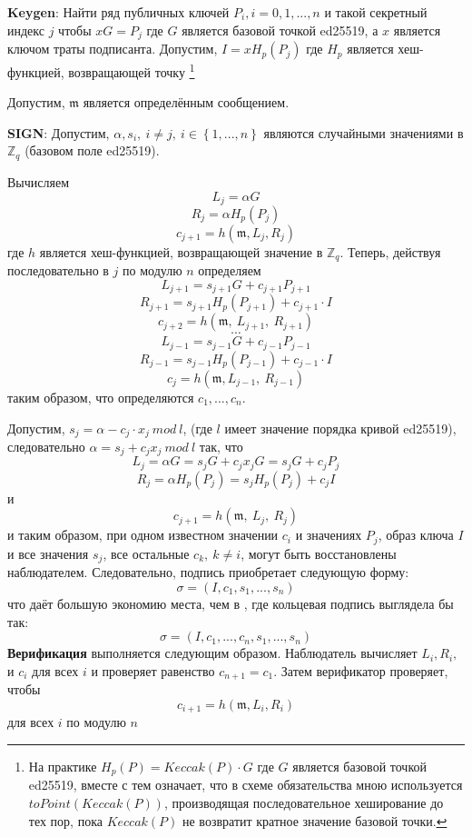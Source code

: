 \documentclass{mrl}
\theoremstyle{definition}
\numberwithin{thm}{section}
\begin{document}
\textbf{Keygen}: Найти ряд публичных ключей $P_{i},i=0,1,...,n$ и такой секретный индекс $j$ чтобы $xG=P_{j}$ где $G$ является базовой точкой ed25519, а $x$ является ключом траты подписанта. Допустим, $I=xH_p\left(P_{j}\right)$ где $H_p$ является хеш-функцией, возвращающей точку \footnote{На практике $H_p(P) = Keccak(P)\cdot G$ где $G$ является базовой точкой ed25519, вместе с тем означает, что в схеме обязательства мною используется $toPoint(Keccak(P))$, производящая последовательное хеширование до тех пор, пока $Keccak(P)$ не возвратит кратное значение базовой точки.}

Допустим, $\mathfrak{m}$ является определённым сообщением.

\textbf{SIGN}: Допустим, $\alpha,s_{i},\ i\neq j,\ i\in\left\{ 1,...,n\right\}$ являются случайными значениями в $\mathbb{Z}_{q}$ (базовом поле ed25519).

Вычисляем
\[
L_{j}=\alpha G
\]
\[
R_{j}=\alpha H_p\left(P_{j}\right)
\]
\[
c_{j+1}=h\left(\mathfrak{m},L_{j},R_{j}\right)
\]
где $h$ является хеш-функцией, возвращающей значение в $\mathbb{Z}_{q}$.
Теперь, действуя последовательно в $j$ по модулю $n$ определяем
\[
L_{j+1}=s_{j+1}G+c_{j+1}P_{j+1}
\]
\[
R_{j+1}=s_{j+1}H_p\left(P_{j+1}\right)+c_{j+1}\cdot I
\]
\[
c_{j+2}=h\left(\mathfrak{m},\ L_{j+1},\ R_{j+1}\right)
\]
\[
\cdots
\]
\[
L_{j-1}=s_{j-1}G+c_{j-1}P_{j-1}
\]
\[
R_{j-1}=s_{j-1}H_p\left(P_{j-1}\right)+c_{j-1}\cdot I
\]
\[
c_{j}=h\left(\mathfrak{m},L_{j-1},\ R_{j-1}\right)
\]
таким образом, что определяются $c_{1},...,c_{n}$.

Допустим, $s_{j}=\alpha-c_{j}\cdot x_j\ mod\ l$, (где $l$ имеет значение порядка кривой ed25519), следовательно $\alpha=s_{j}+c_{j}x_j\ mod\ l$ так, что
\[
L_{j}=\alpha G=s_{j}G+c_{j}x_jG=s_{j}G+c_{j}P_{j}
\]
\[
R_{j}=\alpha
H_p\left(P_{j}\right)=s_{j}H_p\left(P_{j}\right)+c_{j}I
\]
и
\[
c_{j+1}=h\left(\mathfrak{m},\ L_{j},\ R_{j}\right)
\]
и таким образом, при одном известном значении $c_{i}$ и значениях $P_{j}$, образ ключа $I$ и все значения $s_{j}$, все остальные $c_{k},\ k\neq i$, могут быть восстановлены наблюдателем. Следовательно, подпись приобретает следующую форму:
\[
\sigma=\left(I,c_{1},s_{1},...,s_{n}\right)
\]
что даёт большую экономию места, чем в \cite[4.4]{CN}, где кольцевая подпись выглядела бы так:
 \[
\sigma=\left(I,c_{1}, ..., c_{n},s_{1},...,s_{n}\right)
\]
\textbf{Верификация} выполняется следующим образом. Наблюдатель вычисляет $L_{i},R_{i},$ и $c_{i}$ для всех $i$ и проверяет равенство $c_{n+1}=c_{1}$. Затем верификатор проверяет, чтобы
\[
c_{i+1}=h\left(\mathfrak{m},L_{i},R_{i}\right)
\]
для всех $i$ по модулю $n$
\end{document}
